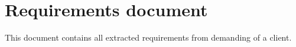 \section{Requirements document}
	This document contains all extracted requirements from demanding of a client.  